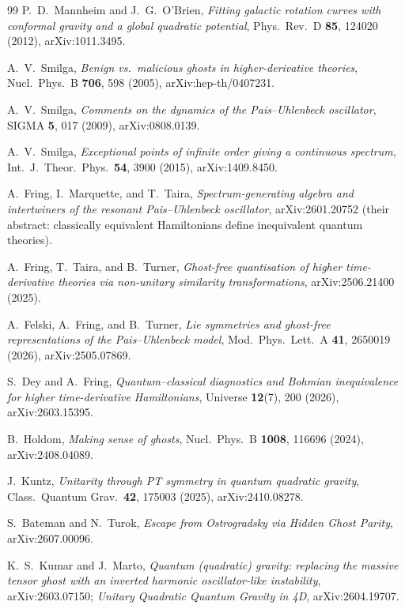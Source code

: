 \documentclass[11pt]{article}
\theoremstyle{definition}
\theoremstyle{remark}
\begin{document}
\begin{thebibliography}{99}
P.~D.~Mannheim and J.~G.~O'Brien,
\emph{Fitting galactic rotation curves with conformal gravity and a
global quadratic potential},
Phys.\ Rev.\ D \textbf{85}, 124020 (2012), arXiv:1011.3495.

A.~V.~Smilga,
\emph{Benign vs.\ malicious ghosts in higher-derivative theories},
Nucl.\ Phys.\ B \textbf{706}, 598 (2005), arXiv:hep-th/0407231.

A.~V.~Smilga,
\emph{Comments on the dynamics of the Pais--Uhlenbeck oscillator},
SIGMA \textbf{5}, 017 (2009), arXiv:0808.0139.

A.~V.~Smilga,
\emph{Exceptional points of infinite order giving a continuous
spectrum},
Int.\ J.\ Theor.\ Phys.\ \textbf{54}, 3900 (2015), arXiv:1409.8450.

A.~Fring, I.~Marquette, and T.~Taira,
\emph{Spectrum-generating algebra and intertwiners of the resonant
Pais--Uhlenbeck oscillator},
arXiv:2601.20752 (their abstract: classically equivalent
Hamiltonians define inequivalent quantum theories).

A.~Fring, T.~Taira, and B.~Turner,
\emph{Ghost-free quantisation of higher time-derivative theories
via non-unitary similarity transformations},
arXiv:2506.21400 (2025).

A.~Felski, A.~Fring, and B.~Turner,
\emph{Lie symmetries and ghost-free representations of the
Pais--Uhlenbeck model},
Mod.\ Phys.\ Lett.\ A \textbf{41}, 2650019 (2026), arXiv:2505.07869.

S.~Dey and A.~Fring,
\emph{Quantum--classical diagnostics and Bohmian inequivalence for
higher time-derivative Hamiltonians},
Universe \textbf{12}(7), 200 (2026), arXiv:2603.15395.

B.~Holdom,
\emph{Making sense of ghosts},
Nucl.\ Phys.\ B \textbf{1008}, 116696 (2024), arXiv:2408.04089.

J.~Kuntz,
\emph{Unitarity through PT symmetry in quantum quadratic gravity},
Class.\ Quantum Grav.\ \textbf{42}, 175003 (2025), arXiv:2410.08278.

S.~Bateman and N.~Turok,
\emph{Escape from Ostrogradsky via Hidden Ghost Parity},
arXiv:2607.00096.

K.~S.~Kumar and J.~Marto,
\emph{Quantum (quadratic) gravity: replacing the massive tensor
ghost with an inverted harmonic oscillator-like instability},
arXiv:2603.07150;
\emph{Unitary Quadratic Quantum Gravity in 4D},
arXiv:2604.19707.


\end{thebibliography}
\end{document}
